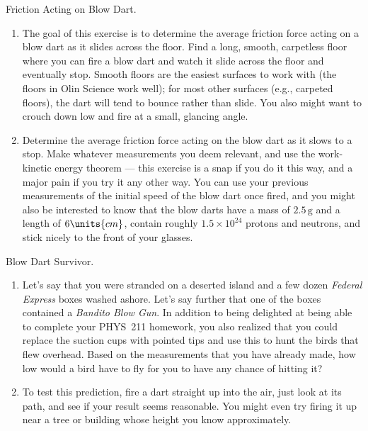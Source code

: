 
\begin{aproblem}{Friction Acting on Blow Dart.}
  \begin{enumerate}
  \item The goal of this exercise is to determine the average friction
    force acting on a blow dart as it slides across the floor.  Find a
    long, smooth, carpetless floor where you can fire a blow dart and
    watch it slide across the floor and eventually stop.  Smooth
    floors are the easiest surfaces to work with (the floors in Olin
    Science work well); for most other surfaces (e.g., carpeted
    floors), the dart will tend to bounce rather than slide.  You also
    might want to crouch down low and fire at a small, glancing angle.

  \item Determine the average friction force acting on the blow dart
    as it slows to a stop.  Make whatever measurements you deem
    relevant, and use the work-kinetic energy theorem --- this
    exercise is a snap if you do it this way, and a major pain if you
    try it any other way.  You can use your previous measurements of
    the initial speed of the blow dart once fired, and you might also
    be interested to know that the blow darts have a mass of $2.5\,
    \mbox{g}$ and a length of $6\units{cm}$, contain roughly
    $1.5\times 10^{24}$ protons and neutrons, and stick nicely to the
    front of your glasses.
  \end{enumerate}
\end{aproblem}



\begin{aproblem}{Blow Dart Survivor.}
  \begin{enumerate}
  \item Let's say that you were stranded on a deserted island and a
    few dozen {\em Federal Express} boxes washed ashore.  Let's say
    further that one of the boxes contained a {\em Bandito Blow Gun}.
    In addition to being delighted at being able to complete your
    PHYS~211 homework, you also realized that you could replace the
    suction cups with pointed tips and use this to hunt the birds that
    flew overhead.  Based on the measurements that you have already
    made, how low would a bird have to fly for you to have any chance
    of hitting it?

  \item To test this prediction, fire a dart straight up into the air,
    just look at its path, and see if your result seems reasonable.
    You might even try firing it up near a tree or building whose
    height you know approximately.
 
  \end{enumerate}
\end{aproblem}

